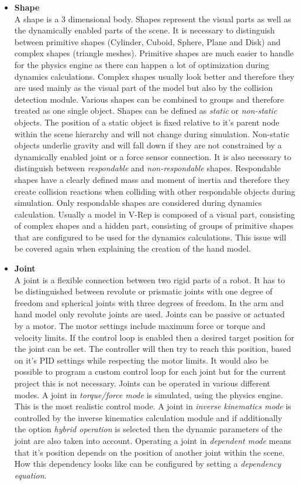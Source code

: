 \begin{itemize}
\item \textbf{Shape} \\
A shape is a 3 dimensional body. Shapes represent the visual parts as well as the dynamically enabled parts of the scene. It is necessary to distinguish between primitive shapes (Cylinder, Cuboid, Sphere, Plane and Disk) and complex shapes (triangle meshes). Primitive shapes are much easier to handle for the physics engine as there can happen a lot of optimization during dynamics calculations. Complex shapes usually look better and therefore they are used mainly as the visual part of the model but also by the collision detection module. Various shapes can be combined to groups and therefore treated as one single object. Shapes can be defined as \emph{static} or \emph{non-static} objects. The position of a static object is fixed relative to it's parent node within the scene hierarchy and will not change during simulation. Non-static objects underlie gravity and will fall down if they are not constrained by a dynamically enabled joint or a force sensor connection. It is also necessary to distinguish between \emph{respondable} and \emph{non-respondable} shapes. Respondable shapes have a clearly defined mass and moment of inertia and therefore they create collision reactions when colliding with other respondable objects during simulation. Only respondable shapes are considered during dynamics calculation. Usually a model in V-Rep is composed of a visual part, consisting of complex shapes and a hidden part, consisting of groups of primitive shapes that are configured to be used for the dynamics calculations. This issue will be covered again when explaining the creation of the hand model.

\item \textbf{Joint} \\
A joint is a flexible connection between two rigid parts of a robot. It has to be distinguished between revolute or prismatic joints with one degree of freedom and spherical joints with three degrees of freedom. In the arm and hand model only revolute joints are used. Joints can be passive or actuated by a motor. The motor settings include maximum force or torque and velocity limits. If the control loop is enabled then a desired target position for the joint can be set. The controller will then try to reach this position, based on it's PID settings while respecting the motor limits. It would also be possible to program a custom control loop for each joint but for the current project this is not necessary. Joints can be operated in various different modes. A joint in \emph{torque/force mode} is simulated, using the physics engine. This is the most realistic control mode. A joint in \emph{inverse kinematics mode} is controlled by the inverse kinematics calculation module and if additionally the option \emph{hybrid operation} is selected then the dynamic parameters of the joint are also taken into account. Operating a joint in \emph{dependent mode} means that it's position depends on the position of another joint within the scene. How this dependency looks like can be configured by setting a \emph{dependency equation}.


\end{itemize}
